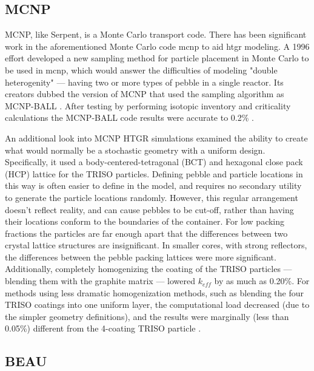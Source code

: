 \subsection{MCNP}
\label{sec:mcnp-beau}

MCNP, like Serpent, is a Monte Carlo transport code. There has been significant work in the aforementioned Monte Carlo code \acrshort{mcnp} to aid \acrshort{htgr} modeling.  A 1996 effort developed a new sampling method for particle placement in Monte Carlo to be used in \acrshort{mcnp}, which would answer the difficulties of modeling "double heterogenity" --- having two or more types of pebble in a single reactor.  Its creators dubbed the version of MCNP that used the sampling algorithm as MCNP-BALL \cite{murata_new_1997}.  After testing by performing isotopic inventory and criticality calculations the MCNP-BALL code results were accurate to 0.2\% \cite{murata_new_1997}.

An additional look into MCNP HTGR simulations examined the ability to create what would normally be a stochastic geometry with a uniform design.  Specifically, it used a body-centered-tetragonal (BCT) and hexagonal close pack (HCP) lattice for the TRISO particles.  Defining pebble and particle locations in this way is often easier to define in the model, and requires no secondary utility to generate the particle locations randomly.  However, this regular arrangement doesn't reflect reality, and can cause pebbles to be cut-off, rather than having their locations conform to the boundaries of the container.  For low packing fractions the particles are far enough apart that the differences between two crystal lattice structures are insignificant.  In smaller cores, with strong reflectors, the differences between the pebble packing lattices were more significant.  Additionally, completely homogenizing the coating of the TRISO particles --- blending them with the graphite matrix --- lowered $k_{eff}$ by as much as 0.20\%.  For methods using less dramatic homogenization methods, such as blending the four TRISO coatings into one uniform layer, the computational load decreased (due to the simpler geometry definitions), and the results were marginally (less than 0.05\%) different from the 4-coating TRISO particle \cite{karriem_mcnp_2001}.

\subsection{BEAU}

